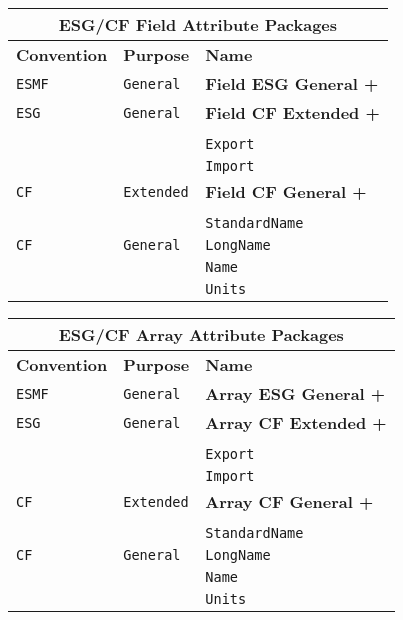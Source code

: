 \label{FieldAttributePackages}
\begin{tabular}{|p{4cm}|p{4cm}|p{6cm}|}
\hline
\multicolumn{3}{|c|}{{\bf \large ESG/CF Field Attribute Packages}} \\
\hline\hline
{\bf Convention} & {\bf Purpose} & {\bf Name} \\
\hline\hline
{\tt ESMF} & {\tt General} & {\bf Field ESG General +} \\
{\tt ESG} & {\tt General} & {\bf Field CF Extended +} \\
& & \\
& & {\tt Export}  \\
 & & {\tt Import} \\ 
\hline
{\tt CF} & {\tt Extended} & {\bf Field CF General +} \\
& & \\
& & {\tt StandardName}\\ 
\hline
{\tt CF} & {\tt General} & {\tt LongName}\\
     & & {\tt Name} \\
     & & {\tt Units}  \\
\hline
\end{tabular}

\label{ArrayAttributePackages}
\begin{tabular}{|p{4cm}|p{4cm}|p{6cm}|}
\hline
\multicolumn{3}{|c|}{{\bf \large ESG/CF Array Attribute Packages}} \\
\hline\hline
{\bf Convention} & {\bf Purpose} & {\bf Name} \\
\hline\hline
{\tt ESMF} & {\tt General} & {\bf Array ESG General +} \\
{\tt ESG} & {\tt General} & {\bf Array CF Extended +} \\
& & \\
& & {\tt Export}  \\
 & & {\tt Import} \\ 
\hline
{\tt CF} & {\tt Extended} & {\bf Array CF General +} \\
& & \\
& & {\tt StandardName}\\ 
\hline
{\tt CF} & {\tt General} & {\tt LongName}\\
     & & {\tt Name} \\
     & & {\tt Units}  \\
\hline
\end{tabular}

